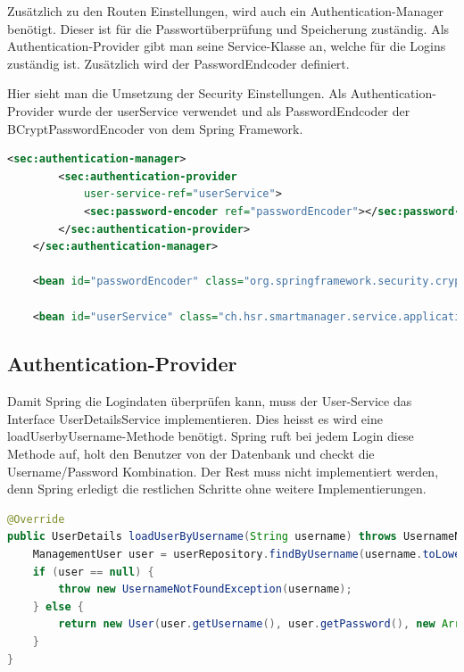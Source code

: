 Zusätzlich zu den Routen Einstellungen, wird auch ein Authentication-Manager benötigt. Dieser ist für die Passwortüberprüfung und Speicherung zuständig. Als Authentication-Provider gibt man seine Service-Klasse an, welche für die Logins zuständig ist. Zusätzlich wird der PasswordEndcoder definiert.

Hier sieht man die Umsetzung der Security Einstellungen. Als Authentication-Provider wurde der userService verwendet und als PasswordEndcoder der BCryptPasswordEncoder von dem Spring Framework.
\begin{lstlisting}[language=xml]
<sec:authentication-manager>
		<sec:authentication-provider
			user-service-ref="userService">
			<sec:password-encoder ref="passwordEncoder"></sec:password-encoder>
		</sec:authentication-provider>
	</sec:authentication-manager>
	
	<bean id="passwordEncoder" class="org.springframework.security.crypto.bcrypt.BCryptPasswordEncoder"></bean>
	
	<bean id="userService" class="ch.hsr.smartmanager.service.applicationservices.UserService"></bean>
\end{lstlisting}

\subsection{Authentication-Provider}
Damit Spring die Logindaten überprüfen kann, muss der User-Service das Interface UserDetailsService implementieren. Dies heisst es wird eine loadUserbyUsername-Methode benötigt. Spring ruft bei jedem Login diese Methode auf, holt den Benutzer von der Datenbank und checkt die Username/Password Kombination. Der Rest muss nicht implementiert werden, denn Spring erledigt die restlichen Schritte ohne weitere Implementierungen.
\begin{lstlisting}[language=java]
@Override
public UserDetails loadUserByUsername(String username) throws UsernameNotFoundException {
	ManagementUser user = userRepository.findByUsername(username.toLowerCase());
	if (user == null) {
		throw new UsernameNotFoundException(username);
	} else {
		return new User(user.getUsername(), user.getPassword(), new ArrayList<>());
	}
}
\end{lstlisting}

	
